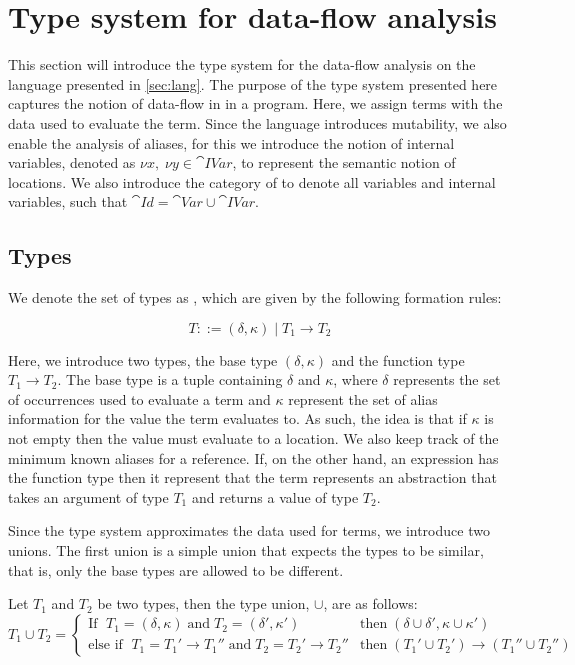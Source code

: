 \documentclass[../../master.tex]{subfiles}
\begin{document}
\section{Type system for data-flow analysis}
This section will introduce the type system for the data-flow analysis on the language presented in \cref{sec:lang}.
The purpose of the type system presented here captures the notion of data-flow in in a program.
Here, we assign terms with the data used to evaluate the term.
Since the language introduces mutability, we also enable the analysis of aliases, for this we introduce the notion of internal variables, denoted as $\nu x,\; \nu y\in\cat{IVar}$, to represent the semantic notion of locations.
We also introduce the category of  to denote all variables and internal variables, such that $\cat{Id}=\cat{Var}\cup\cat{IVar}$.

\subsection{Types}
We denote the set of types as , which are given by the following formation rules:

$$T::=(\delta,\kappa)\mid T_1 \rightarrow T_2$$

Here, we introduce two types, the base type $(\delta,\kappa)$ and the function type $T_1 \rightarrow T_2$.
The base type is a tuple containing $\delta$ and $\kappa$, where $\delta$ represents the set of occurrences used to evaluate a term and $\kappa$ represent the set of alias information for the value the term evaluates to.
As such, the idea is that if $\kappa$ is not empty then the value must evaluate to a location.
We also keep track of the minimum known aliases for a reference.
If, on the other hand, an expression has the function type then it represent that the term represents an abstraction that takes an argument of type $T_1$ and returns a value of type $T_2$.

Since the type system approximates the data used for terms, we introduce two unions.
The first union is a simple union that expects the types to be similar, that is, only the base types are allowed to be different.
\begin{definition}
	Let $T_1$ and $T_2$ be two types, then the type union, $\cup$, are as follows:
	\begin{equation*}
		T_1\cup T_2=
		\left\{\begin{matrix}
			\mbox{If } \; T_1=(\delta,\kappa) \;\mbox{and}\; T_2=(\delta',\kappa')  & \mbox{then} \; (\delta\cup\delta',\kappa\cup\kappa')\\
			\mbox{else if } \; T_1=T_1'\rightarrow T_1''\;\mbox{and}\;T_2=T_2'\rightarrow T_2'' & \mbox{then} \; (T_1'\cup T_2')\rightarrow (T_1''\cup T_2'')
		\end{matrix}\right.
	\end{equation*}
\end{definition}
\end{document}
